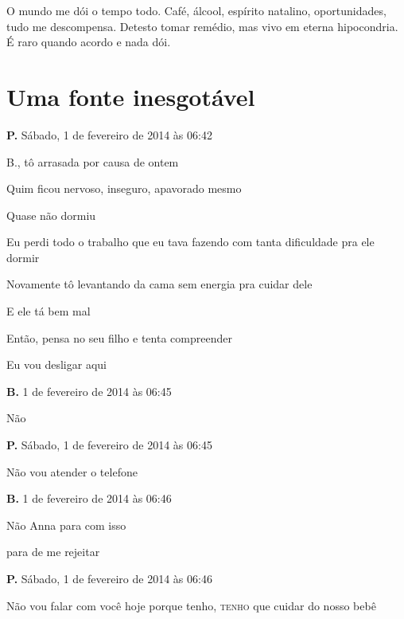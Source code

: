 O mundo me dói o tempo todo. Café, álcool, espírito natalino,
oportunidades, tudo me descompensa. Detesto tomar remédio, mas vivo em
eterna hipocondria. É raro quando acordo e nada dói.

\endgroup

\chapter{Uma fonte inesgotável}\label{uma-fonte-inesgotuxe1vel}

{\parindent0pt\parskip1pt\raggedright
\textbf{P.} Sábado, 1 de fevereiro de 2014 às 06:42

B., tô arrasada por causa de ontem

Quim ficou nervoso, inseguro, apavorado mesmo

Quase não dormiu

Eu perdi todo o trabalho que eu tava fazendo com tanta dificuldade pra
ele dormir

Novamente tô levantando da cama sem energia pra cuidar dele

E ele tá bem mal

Então, pensa no seu filho e tenta compreender

Eu vou desligar aqui

\textbf{B.} 1 de fevereiro de 2014 às 06:45

Não

\textbf{P.} Sábado, 1 de fevereiro de 2014 às 06:45

Não vou atender o telefone

\textbf{B.} 1 de fevereiro de 2014 às 06:46

Não Anna para com isso

para de me rejeitar

\textbf{P.} Sábado, 1 de fevereiro de 2014 às 06:46

Não vou falar com você hoje porque tenho, \textsc{tenho} que cuidar do
nosso bebê

}
